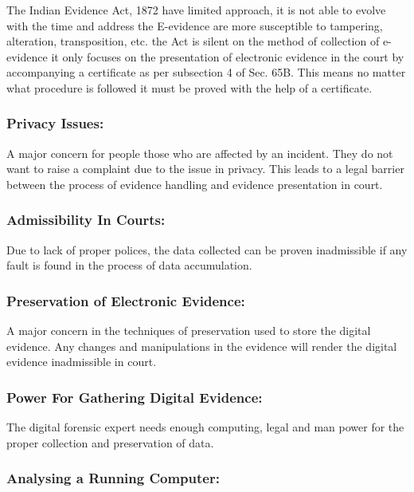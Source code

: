 \documentclass[british]{article}
\begin{document}
The Indian Evidence Act, 1872 have limited approach, it is not able
to evolve with the time and address the E-evidence are more susceptible
to tampering, alteration, transposition, etc. the Act is silent on
the method of collection of e-evidence it only focuses on the presentation
of electronic evidence in the court by accompanying a certificate
as per subsection 4 of Sec. 65B. This means no matter what procedure
is followed it must be proved with the help of a certificate.

\subsubsection{Privacy Issues:}

A major concern for people those who are affected by an incident.
They do not want to raise a complaint due to the issue in privacy.
This leads to a legal barrier between the process of evidence handling
and evidence presentation in court.

\subsubsection{Admissibility In Courts:}

Due to lack of proper polices, the data collected can be proven inadmissible
if any fault is found in the process of data accumulation.

\subsubsection{Preservation of Electronic Evidence:}

A major concern in the techniques of preservation used to store the
digital evidence. Any changes and manipulations in the evidence will
render the digital evidence inadmissible in court.

\subsubsection{Power For Gathering Digital Evidence:}

The digital forensic expert needs enough computing, legal and man
power for the proper collection and preservation of data.

\subsubsection{Analysing a Running Computer:}
\end{document}
